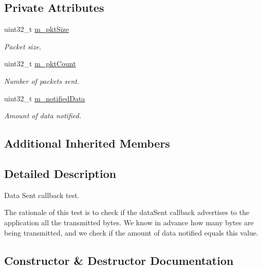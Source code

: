 \subsection*{Private Attributes}
\begin{DoxyCompactItemize}
\item 
uint32\+\_\+t \hyperlink{classTcpDataSentCbTestCase_ae9b70582fec8ee23fb78adbba8234da4}{m\+\_\+pkt\+Size}
\begin{DoxyCompactList}\small\item\em Packet size. \end{DoxyCompactList}\item 
uint32\+\_\+t \hyperlink{classTcpDataSentCbTestCase_ab001b0a6e03fae5dad33aab37f29b476}{m\+\_\+pkt\+Count}
\begin{DoxyCompactList}\small\item\em Number of packets sent. \end{DoxyCompactList}\item 
uint32\+\_\+t \hyperlink{classTcpDataSentCbTestCase_a681db9a235aa1f24930cb06cffa58366}{m\+\_\+notified\+Data}
\begin{DoxyCompactList}\small\item\em Amount of data notified. \end{DoxyCompactList}\end{DoxyCompactItemize}
\subsection*{Additional Inherited Members}


\subsection{Detailed Description}
Data Sent callback test. 

The rationale of this test is to check if the data\+Sent callback advertises to the application all the transmitted bytes. We know in advance how many bytes are being transmitted, and we check if the amount of data notified equals this value. 

\subsection{Constructor \& Destructor Documentation}

